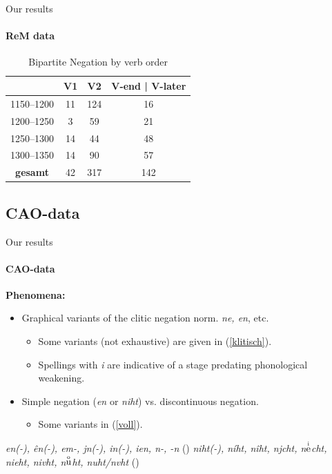 \documentclass[xcolor=table, compress, %
handout
]{beamer}
\newcommand{\supr}[2]{$\stackrel{\text{\smaller#2}}{\text{#1}}$}
\begin{document}
\begin{frame}{Our results}
\framesubtitle{ReM data}


\begin{table}
\begin{center}
\begin{tabular}{c c c c}
\toprule
 & \textbf{V1} & \textbf{V2} & \textbf{V-end | V-later}\\
\hline
1150–1200 & 11 & 124 & 16\\
\hline
1200–1250 & 3 & 59 & 21\\
\hline
1250–1300 & 14 & 44 & 48\\
\hline
1300–1350 & 14 & 90 & 57\\ 
\hline
\textbf{gesamt} & 42 & 317 & 142\\
\bottomrule
\end{tabular}
\caption{Bipartite Negation by verb order}
\end{center}
\end{table}

\end{frame}




\subsection{CAO-data}

\begin{frame}{Our results}
\framesubtitle{CAO-data}

\textbf{Phenomena:}

\begin{itemize}
\item Graphical variants of the \alert{clitic negation} norm. \textit{ne, en}, etc.
\begin{itemize}
\item Some variants (not exhaustive) are given in (\ref{klitisch}).
\item Spellings with \textit{i} are indicative of a stage predating phonological weakening.
\end{itemize}
\item \alert{Simple negation} (\textit{en} or \textit{niht}) vs. \alert{discontinuous negation.}
\begin{itemize}
\item Some variants in (\ref{voll}).
\end{itemize}
\end{itemize}


\begin{exe}
\ex  \textit{en(-), ên(-), em-, jn(-), in(-), ien, n-, -n}  (\citealt[1292–1293]{wmu2}) \label{klitisch}
\ex \textit{niht(-), níht, nîht, njcht, n\supr{e}{i}cht, nieht, nivht, n\supr{u}{o}ht, nuht/nvht} (\citealt[1312–1315]{wmu2})  \label{voll}
\end{exe}

\end{frame}
\end{document}
